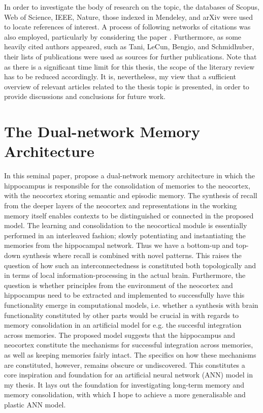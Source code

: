 In order to investigate the body of research on the topic, the databases of Scopus, Web of Science, IEEE, Nature, those indexed in Mendeley, and arXiv were used to locate references of interest. A process of following networks of citations was also employed, particularly by considering the paper \citep{McClelland1995}. Furthermore, as some heavily cited authors appeared, such as Tani, LeCun, Bengio, and Schmidhuber, their lists of publications were used as sources for further publications. Note that as there is a significant time limit for this thesis, the scope of the literary review has to be reduced accordingly. It is, nevertheless, my view that a sufficient overview of relevant articles related to the thesis topic is presented, in order to provide discussions and conclusions for future work.

\section{The Dual-network Memory Architecture}

In this seminal paper, \cite{McClelland1995} propose a dual-network memory architecture in which the hippocampus is responsible for the consolidation of memories to the neocortex, with the neocortex storing semantic and episodic memory. The synthesis of recall from the deeper layers of the neocortex and representations in the working memory itself enables contexts to be distinguished or connected in the proposed model. The learning and consolidation to the neocortical module is essentially performed in an interleaved fashion; slowly potentiating and instantiating the memories from the hippocampal network. Thus we have a bottom-up and top-down synthesis where recall is combined with novel patterns. This raises the question of how such an interconnectedness is constituted both topologically and in terms of local information-processing in the actual brain. Furthermore, the question is whether principles from the environment of the neocortex and hippocampus need to be extracted and implemented to successfully have this functionality emerge in computational models, i.e. whether a synthesis with brain functionality constituted by other parts would be crucial in with regards to memory consolidation in an artificial model for e.g. the succesful integration across memories. The proposed model suggests that the hippocampus and neocortex constitute the mechanisms for successful integration across memories, as well as keeping memories fairly intact. The specifics on how these mechanisms are constituted, however, remains obscure or undiscovered. This constitutes a core inspiration and foundation for an artificial neural network (ANN) model in my thesis. It lays out the foundation for investigating long-term memory and memory consolidation, with which I hope to achieve a more generalisable and plastic ANN model.

